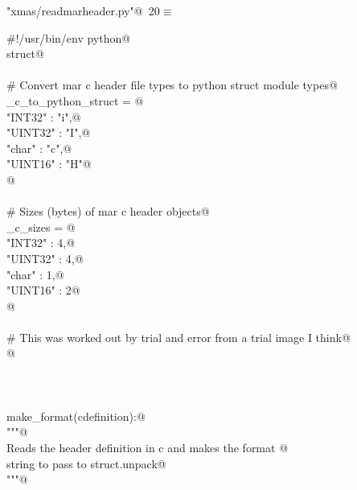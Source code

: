 \documentclass[10pt,a4paper,twoside,notitlepage]{article}
\begin{document}
\begin{flushleft} \small
\begin{minipage}{\linewidth}\label{scrap18}\raggedright\small
{} \verb@"xmas/readmarheader.py"@\nobreak\ {\footnotesize {20}}$\equiv$
\vspace{-1ex}
\begin{list}{}{} \item
\mbox{}\verb@#!/usr/bin/env python@\\
\mbox{}\verb@import struct@\\
\mbox{}\verb@@\\
\mbox{}\verb@# Convert mar c header file types to python struct module types@\\
\mbox{}\verb@mar_c_to_python_struct = {@\\
\mbox{}\verb@    "INT32"  : "i",@\\
\mbox{}\verb@    "UINT32" : "I",@\\
\mbox{}\verb@    "char"   : "c",@\\
\mbox{}\verb@    "UINT16" : "H"@\\
\mbox{}\verb@    }@\\
\mbox{}\verb@@\\
\mbox{}\verb@# Sizes (bytes) of mar c header objects@\\
\mbox{}\verb@mar_c_sizes = {@\\
\mbox{}\verb@    "INT32"  : 4,@\\
\mbox{}\verb@    "UINT32" : 4,@\\
\mbox{}\verb@    "char"   : 1,@\\
\mbox{}\verb@    "UINT16" : 2@\\
\mbox{}\verb@    }@\\
\mbox{}\verb@@\\
\mbox{}\verb@# This was worked out by trial and error from a trial image I think@\\
\mbox{}@\\
\mbox{}\verb@@\\
\mbox{}\verb@@\\
\mbox{}\verb@@\\
\mbox{}\verb@def make_format(cdefinition):@\\
\mbox{}\verb@    """@\\
\mbox{}\verb@    Reads the header definition in c and makes the format @\\
\mbox{}\verb@    string to pass to struct.unpack@\\
\mbox{}\verb@    """@\\

\end{list}
\end{minipage}
\end{flushleft}
\end{document}
